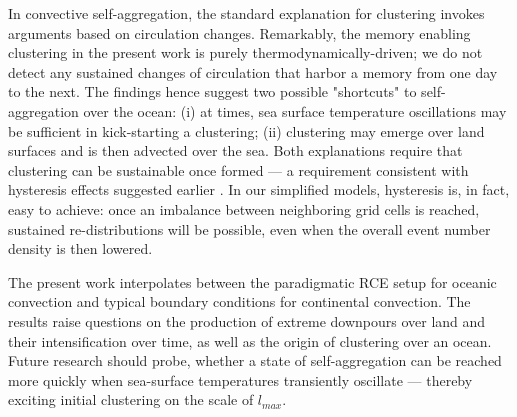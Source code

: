 \documentclass[draft,linenumbers]{agujournal2019}
\begin{document}
In convective self-aggregation, the standard explanation for clustering invokes arguments based on circulation changes.
Remarkably, the memory enabling clustering in the present work is purely thermodynamically-driven; we do not detect any sustained changes of circulation that harbor a memory from one day to the next.
The findings hence suggest two possible "shortcuts" to self-aggregation over the ocean: 
(i) at times, sea surface temperature oscillations may be sufficient in kick-starting a clustering;
(ii) clustering may emerge over land surfaces and is then advected over the sea.
Both explanations require that clustering can be sustainable once formed --- a requirement consistent with hysteresis effects suggested earlier \cite{muller2015favors}.
In our simplified models, hysteresis is, in fact, easy to achieve: once an imbalance between neighboring grid cells is reached, sustained re-distributions will be possible, even when the overall event number density is then lowered.

The present work interpolates between the paradigmatic RCE setup for oceanic convection and typical boundary conditions for continental convection. 
The results raise questions on the production of extreme downpours over land and their intensification over time, as well as the origin of clustering over an ocean.
Future research should probe, whether a state of self-aggregation can be reached more quickly when sea-surface temperatures transiently oscillate --- thereby exciting initial clustering on the scale of $l_{max}$.

\newpage
\clearpage
\end{document}
